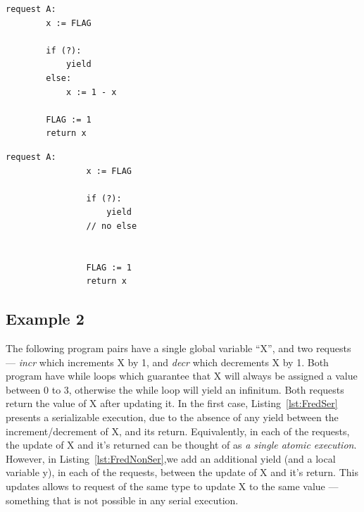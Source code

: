 
\noindent
\begin{minipage}[t]{0.45\textwidth}
	\begin{lstlisting}[caption={Serializable},
		label={lst:BasicSer}]
	request A: 
		x := FLAG
		
		if (?):
			yield
		else:
			x := 1 - x
		
		FLAG := 1
		return x
	\end{lstlisting}
\end{minipage}
\hfill
\begin{minipage}[t]{0.45\textwidth}
	\begin{lstlisting}[caption={Not serializable: {(A,0),(A,0)}},
	label={lst:BasicNonSer}]
			request A: 
			    x := FLAG 
			
			    if (?): 
			        yield
			    // no else
			
			
			    FLAG := 1 
			    return x
		\end{lstlisting}
\end{minipage}%

\subsection{Example 2}

The following program pairs have a single global variable ``X'', and two requests --- \textit{incr} which increments X by 1, and \textit{decr} which decrements X by 1. Both program have while loops which guarantee that X will always be assigned a value between 0 to 3, otherwise the while loop will yield an infinitum. Both requests return the value of X after updating it.
%
In the first case, Listing~\ref{lst:FredSer} presents a serializable execution, due to the absence of any yield between the increment/decrement of X, and its return. Equivalently, in each of the requests, the update of X and it's returned can be thought of as \textit{a single atomic execution}.
%
However, in Listing~\ref{lst:FredNonSer},we add an additional yield (and a local variable y), in each of the requests, between the update of X and it's return.
%
This updates allows to request of the same type to update X to the same value --- something that is not possible in any serial execution. 

